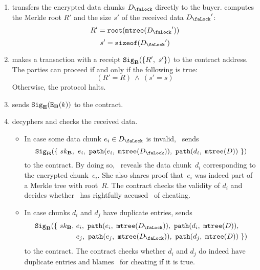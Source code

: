 \begin{enumerate}
\item {} transfers the encrypted data chunks $\Lock{D}$ directly to the buyer.  computes the Merkle root $R'$ and the size $s'$ of the received data $\Lock{D}'$:
\begin{equation}
R' = \Root(\MerkleTree(\Lock{D}'))
\end{equation}
\begin{equation}
s' = \SizeOf(\Lock{D}')
\end{equation}
\item \label{step:buyers-receipt}  makes a transaction with a receipt $\mathtt{Sig}_{\mathbf{B}}(\{R',\ s'\})$ to the contract address. The parties can proceed if and only if the following is true:
\begin{equation}
(R' = R)\ \land\ (s' = s)
\end{equation}
Otherwise, the protocol halts.
\item \label{step:secret-sharing}  sends $\mathtt{Sig}_{\mathbf{E}}(\mathtt{E}_{\mathbf{B}}(k))$ to the contract.
\item \label{step:arbitrage}  decyphers and checks the received data.

  \begin{itemize}
    \item In case some data chunk $e_i \in \Lock{D}$ is invalid, ~sends
    \begin{equation*}
      \Sign_\Party{B}(\{\ \SecretKey{B},\ e_i,\ \Path(e_i,\ \MerkleTree(\Lock{D})),\ \Path(d_i,\ \MerkleTree(D))\ \})
    \end{equation*}
    to the contract. By doing so, ~reveals the data chunk~$d_i$ corresponding to the encrypted chunk~$e_i$. She also shares proof that~$e_i$ was indeed part of a  Merkle tree with root~$R$. The contract checks the validity of $d_i$ and decides whether ~has rightfully accused~ of cheating.

    \item In case chunks $d_i$ and $d_j$ have duplicate entries,  sends
    \begin{equation*}
      \begin{split}
        \Sign_\Party{B}(\{\ \SecretKey{B}, & \ e_i,\ \Path(e_i,\ \MerkleTree(\Lock{D})),\ \Path(d_i,\ \MerkleTree(D)),\\
         & \ e_j,\ \Path(e_j,\ \MerkleTree(\Lock{D})),\ \Path(d_j,\ \MerkleTree(D))\ \})
      \end{split}
    \end{equation*}
    to the contract. The contract checks whether $d_i$ and $d_j$ do indeed have duplicate entries and blames~ for cheating if it is true.
  \end{itemize}
\end{enumerate}

